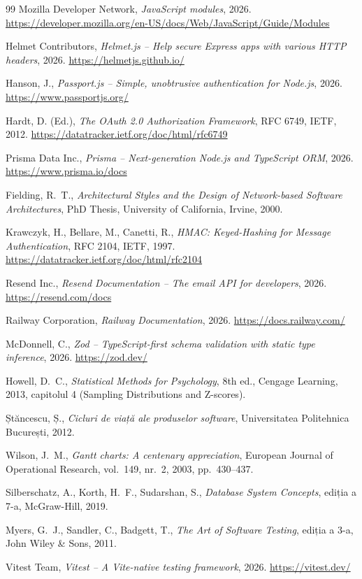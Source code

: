\documentclass[12pt,a4paper,oneside]{report}
\begin{document}
\begin{thebibliography}{99}
Mozilla Developer Network, \emph{JavaScript modules}, 2026. \url{https://developer.mozilla.org/en-US/docs/Web/JavaScript/Guide/Modules}

Helmet Contributors, \emph{Helmet.js -- Help secure Express apps with various HTTP headers}, 2026. \url{https://helmetjs.github.io/}

Hanson, J., \emph{Passport.js -- Simple, unobtrusive authentication for Node.js}, 2026. \url{https://www.passportjs.org/}

Hardt, D. (Ed.), \emph{The OAuth 2.0 Authorization Framework}, RFC 6749, IETF, 2012. \url{https://datatracker.ietf.org/doc/html/rfc6749}

Prisma Data Inc., \emph{Prisma -- Next-generation Node.js and TypeScript ORM}, 2026. \url{https://www.prisma.io/docs}

Fielding, R.~T., \emph{Architectural Styles and the Design of Network-based Software Architectures}, PhD Thesis, University of California, Irvine, 2000.

Krawczyk, H., Bellare, M., Canetti, R., \emph{HMAC: Keyed-Hashing for Message Authentication}, RFC 2104, IETF, 1997. \url{https://datatracker.ietf.org/doc/html/rfc2104}

Resend Inc., \emph{Resend Documentation -- The email API for developers}, 2026. \url{https://resend.com/docs}

Railway Corporation, \emph{Railway Documentation}, 2026. \url{https://docs.railway.com/}

McDonnell, C., \emph{Zod -- TypeScript-first schema validation with static type inference}, 2026. \url{https://zod.dev/}

Howell, D.~C., \emph{Statistical Methods for Psychology}, 8th ed., Cengage Learning, 2013, capitolul 4 (Sampling Distributions and Z-scores).

Ștăncescu, Ș., \emph{Cicluri de viață ale produselor software}, Universitatea Politehnica București, 2012.

Wilson, J.~M., \emph{Gantt charts: A centenary appreciation}, European Journal of Operational Research, vol.~149, nr.~2, 2003, pp.~430--437.

Silberschatz, A., Korth, H.~F., Sudarshan, S., \emph{Database System Concepts}, ediția a 7-a, McGraw-Hill, 2019.

Myers, G.~J., Sandler, C., Badgett, T., \emph{The Art of Software Testing}, ediția a 3-a, John Wiley \& Sons, 2011.

Vitest Team, \emph{Vitest -- A Vite-native testing framework}, 2026. \url{https://vitest.dev/}

\end{thebibliography}
\end{document}
